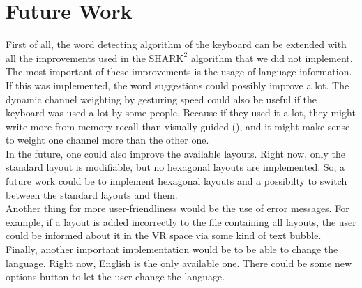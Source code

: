 \section{Future Work}
First of all, the word detecting algorithm of the keyboard can be extended with all the improvements used in the $\text{SHARK}^2$ algorithm that we did not implement. The most important of these improvements is the usage of language information. If this was implemented, the word suggestions could possibly improve a lot. The dynamic channel weighting by gesturing speed could also be useful if the keyboard was used a lot by some people. Because if they used it a lot, they might write more from memory recall than visually guided (), and it might make sense to weight one channel more than the other one.\\
In the future, one could also improve the available layouts. Right now, only the standard layout is modifiable, but no hexagonal layouts are implemented. So, a future work could be to implement hexagonal layouts and a possibilty to switch between the standard layouts and them.\\
Another thing for more user-friendliness would be the use of error messages. For example, if a layout is added incorrectly to the file containing all layouts, the user could be informed about it in the VR space via some kind of text bubble.\\
Finally, another important implementation would be to be able to change the language. Right now, English is the only available one. There could be some new options button to let the user change the language.